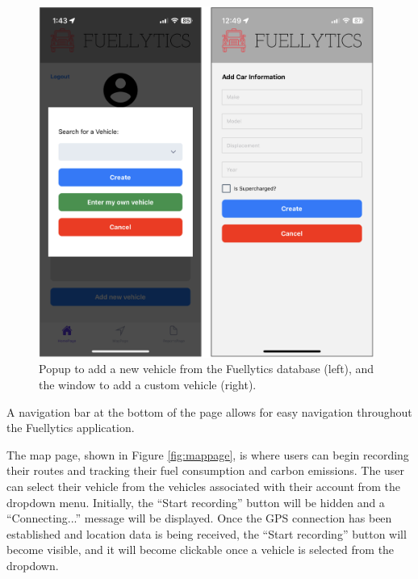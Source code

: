 \documentclass[11pt, oneside]{article}
\begin{document}
\begin{figure}[H]
\centerline{\includegraphics[width=11cm]{img/add-new-vehicle.png}}
\caption{\label{fig:new-vehicle} Popup to add a new vehicle from the Fuellytics database (left), and the window to add a custom vehicle (right).}
\end{figure}

A navigation bar at the bottom of the page allows for easy navigation throughout the Fuellytics application.

The map page, shown in Figure \ref*{fig:mappage}, is where users can begin recording their routes and tracking their fuel consumption and carbon emissions.  The user can select their vehicle from the vehicles associated with their account from the dropdown menu.  Initially, the ``Start recording'' button will be hidden and a ``Connecting...'' message will be displayed.  Once the GPS connection has been established and location data is being received, the ``Start recording'' button will become visible, and it will become clickable once a vehicle is selected from the dropdown.
\end{document}
